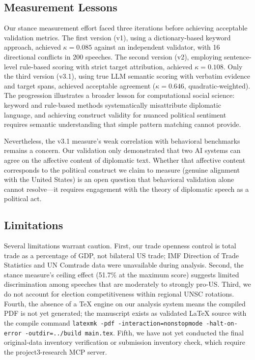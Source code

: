 \subsection{Measurement Lessons}

Our stance measurement effort faced three iterations before achieving acceptable validation metrics. The first version (v1), using a dictionary-based keyword approach, achieved $\kappa = 0.085$ against an independent validator, with 16 directional conflicts in 200 speeches. The second version (v2), employing sentence-level rule-based scoring with strict target attribution, achieved $\kappa = 0.108$. Only the third version (v3.1), using true LLM semantic scoring with verbatim evidence and target spans, achieved acceptable agreement ($\kappa = 0.646$, quadratic-weighted). The progression illustrates a broader lesson for computational social science: keyword and rule-based methods systematically misattribute diplomatic language, and achieving construct validity for nuanced political sentiment requires semantic understanding that simple pattern matching cannot provide.

Nevertheless, the v3.1 measure's weak correlation with behavioral benchmarks remains a concern. Our validation only demonstrated that two AI systems can agree on the affective content of diplomatic text. Whether that affective content corresponds to the political construct we claim to measure (genuine alignment with the United States) is an open question that behavioral validation alone cannot resolve---it requires engagement with the theory of diplomatic speech as a political act.

\subsection{Limitations}

Several limitations warrant caution. First, our trade openness control is total trade as a percentage of GDP, not bilateral US trade; IMF Direction of Trade Statistics and UN Comtrade data were unavailable during analysis. Second, the stance measure's ceiling effect (51.7\% at the maximum score) suggests limited discrimination among speeches that are moderately to strongly pro-US. Third, we do not account for election competitiveness within regional UNSC rotations. Fourth, the absence of a TeX engine on our analysis system means the compiled PDF is not yet generated; the manuscript exists as validated LaTeX source with the compile command \texttt{latexmk -pdf -interaction=nonstopmode -halt-on-error -outdir=../build main.tex}. Fifth, we have not yet conducted the final original-data inventory verification or submission inventory check, which require the project3-research MCP server.
